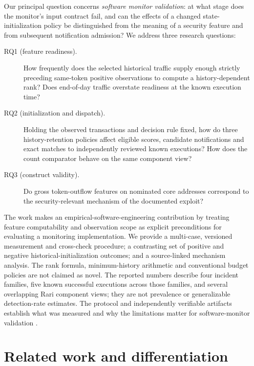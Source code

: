 \documentclass[preprint,12pt,authoryear]{elsarticle}
\begin{document}
Our principal question concerns \emph{software monitor validation}: at what stage does the monitor's input contract fail, and can the effects of a changed state-initialization policy be distinguished from the meaning of a security feature and from subsequent notification admission? We address three research questions:

\begin{description}
\item[RQ1 (feature readiness).] How frequently does the selected historical traffic supply enough strictly preceding same-token positive observations to compute a history-dependent rank? Does end-of-day traffic overstate readiness at the known execution time?
\item[RQ2 (initialization and dispatch).] Holding the observed transactions and decision rule fixed, how do three history-retention policies affect eligible scores, candidate notifications and exact matches to independently reviewed known executions? How does the count comparator behave on the same component view?
\item[RQ3 (construct validity).] Do gross token-outflow features on nominated core addresses correspond to the security-relevant mechanism of the documented exploit?
\end{description}

The work makes an empirical-software-engineering contribution by treating feature computability and observation scope as explicit preconditions for evaluating a monitoring implementation. We provide a multi-case, versioned measurement and cross-check procedure; a contrasting set of positive and negative historical-initialization outcomes; and a source-linked mechanism analysis. The rank formula, minimum-history arithmetic and conventional budget policies are not claimed as novel. The reported numbers describe four incident families, five known successful executions across those families, and several overlapping Rari component views; they are not prevalence or generalizable detection-rate estimates. The protocol and independently verifiable artifacts establish what was measured and why the limitations matter for software-monitor validation \citep{Kitchenham2004Evidence,Wohlin2012Experimentation}.

\section{Related work and differentiation}\label{sec:related}
\end{document}
